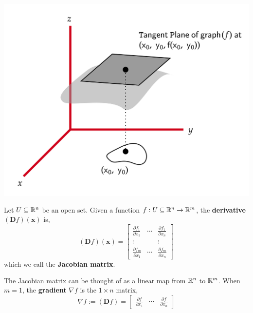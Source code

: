 \begin{marginfigure}
\begin{center}
       \includegraphics[width=\textwidth]{figures/wk-2/fig-25.png}
\end{center}
\end{marginfigure}

\begin{defn}[Jacobian]
    Let $U \subseteq \mathbb{R}^n$ be an open set. Given a function $f: U \subseteq \mathbb{R}^n \rightarrow \mathbb{R}^m$, the \textbf{derivative} $(\mathbf{D} f)(\mathbf{x})$ is,
    \[
    (\mathbf{D} f)(\mathbf{x})=\left[\begin{array}{ccc}
    \frac{\partial f_1}{\partial x_1} & \cdots & \frac{\partial f_1}{\partial x_n} \\
    \vdots & & \vdots \\
    \frac{\partial f_m}{\partial x_1} & \cdots & \frac{\partial f_m}{\partial x_n}
    \end{array}\right]
    \]
    which we call the \textbf{Jacobian matrix}.
\end{defn}

\begin{rmk}
The Jacobian matrix can be thought of as a linear map from $\mathbb{R}^n$ to $\mathbb{R}^m$. When $m = 1$, the \textbf{gradient} $\nabla f$ is the $1 \times n$ matrix,
\[
    \nabla f := (\mathbf{D} f) =\left[\begin{array}{lll}
    \frac{\partial f}{\partial x_1} & \cdots & \frac{\partial f}{\partial x_n}
    \end{array}\right]
\]
\end{rmk}

